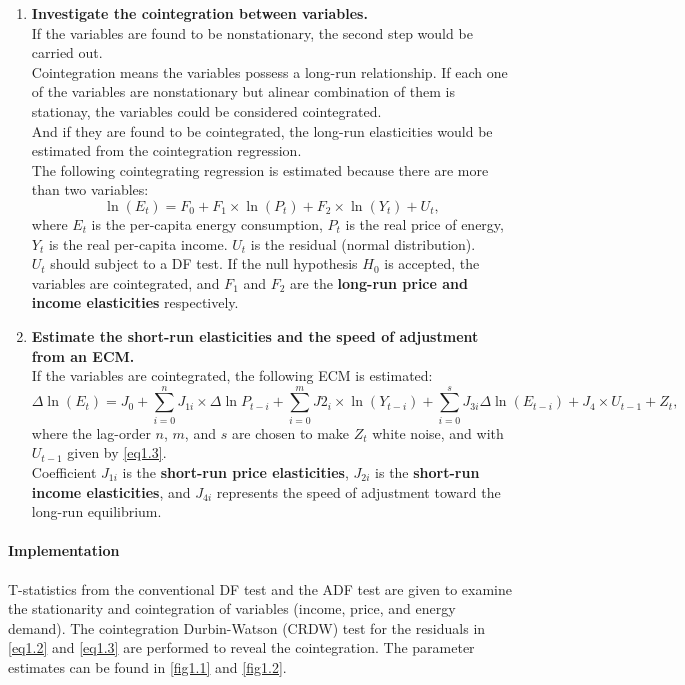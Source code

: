 {\begin{enumerate}
		\item  \textbf{Investigate the cointegration between variables. }\\
		If the variables are found to be nonstationary, the second step would be carried out. \\
		\small {Cointegration means the variables possess a long-run relationship. If each one of the variables are nonstationary but alinear combination of them is stationay, the variables could be considered cointegrated.}\\
		And if they are found to be cointegrated, the long-run elasticities would be estimated from the cointegration regression. \\
		The following cointegrating regression is estimated because there are more than two variables: 
		\begin{equation}\label{eq1.3}
			\ln(E_t) = F_0 + F_1 \times \ln(P_t)+ F_2 \times \ln(Y_t) + U_t,
		\end{equation}
		where $E_t$ is the per-capita energy consumption, $P_t$ is the real price of energy, $Y_t$ is the real per-capita income. $U_t$ is the residual (normal distribution).\\
		$U_t$ should subject to a DF test. If the null hypothesis $H_0$ is accepted, the variables are cointegrated, and $F_1$ and $F_2$ are the \textbf{long-run price and income elasticities} respectively. \\ 
		
		\item \textbf{Estimate the short-run elasticities and the speed of adjustment from an ECM. }\\
		If the variables are cointegrated, the following ECM is estimated: 
		\begin{equation}\label{eq1.4}
			\Delta \ln(E_t) = J_0 + \sum_{i=0}^{n} J_{1i} \times \Delta \ln{P_{t-i}} + \sum_{i=0}^{m} J2_i \times \ln(Y_{t-i})+ \sum_{i=0}^{s} J_{3i} \Delta \ln(E_{t-i}) + J_4 \times U_{t-1} + Z_t,
		\end{equation}
		where the lag-order $n$, $m$, and $s$ are chosen to make $Z_t$ white noise, and with $U_{t-1}$ given by \cref{eq1.3}. \\
		Coefficient $J_{1i}$ is the \textbf{short-run price elasticities}, $J_{2i}$ is the \textbf{short-run income elasticities}, and $J_{4i}$ represents the speed of adjustment toward the long-run equilibrium.\\		
	\end{enumerate}
}

\paragraph{Implementation\\}{T-statistics from the conventional DF test and the ADF test are given to examine the stationarity and cointegration of variables (income, price, and energy demand). The cointegration Durbin-Watson (CRDW) test for the residuals in \cref{eq1.2} and \cref{eq1.3} are performed to reveal the cointegration. The parameter estimates can be found in \cref{fig1.1} and \cref{fig1.2}. }

